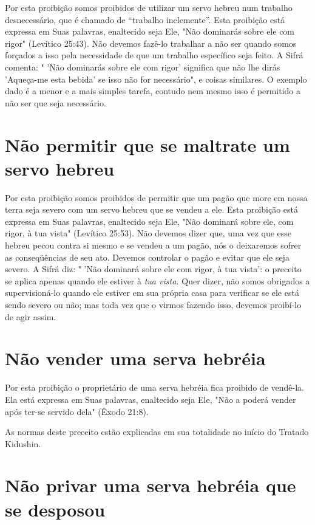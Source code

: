 Por esta proibição somos proibidos de utilizar um servo hebreu num
trabalho desnecessário, que é chamado de ``trabalho inclemente''. Esta
proibi­ção está expressa em Suas palavras, enaltecido seja Ele, "Não
dominarás sobre ele com rigor" (Levítico 25:43). Não devemos fazê-lo
trabalhar a não ser quan­do somos forçados a isso pela necessidade de
que um trabalho específico seja feito. A Sifrá comenta: " 'Não dominarás
sobre ele com rigor' significa que não lhe dirás 'Aqueça-me esta bebida'
se isso não for necessário", e coisas similares. O exemplo dado é a
menor e a mais simples tarefa, contudo nem mesmo isso é permitido a não
ser que seja necessário.

\section{Não permitir que se maltrate um servo hebreu}

Por esta proibição somos proibidos de permitir que um pagão que more em
nossa terra seja severo com um servo hebreu que se vendeu a ele. Esta
proibição está expressa em Suas palavras, enaltecido seja Ele, "Não
domi­nará sobre ele, com rigor, à tua vista" (Levítico 25:53). Não
devemos dizer que, uma vez que esse hebreu pecou contra si mesmo e se
vendeu a um pagão, nós o deixaremos sofrer as conseqüências de seu ato.
Devemos controlar o pagão e evitar que ele seja severo. A Sifrá diz: "
'Não dominará sobre ele com rigor, à tua vista': o preceito se aplica
apenas quando ele estiver à \emph{tua vista.} Quer dizer, não somos
obrigados a supervisioná-lo quando ele estiver em sua pró­pria casa para
verificar se ele está sendo severo ou não; mas toda vez que o virmos
fazendo isso, devemos proibí-lo de agir assim.


\section{Não vender uma serva hebréia}


Por esta proibição o proprietário de uma serva hebréia fica proibido de
vendê-la. Ela está expressa em Suas palavras, enaltecido seja Ele, "Não
a po­derá vender após ter-se servido dela" (Êxodo 21:8).

As normas deste preceito estão explicadas em sua totalidade no iní­cio
do Tratado Kidushin.

\section{Não privar uma serva hebréia que se desposou}

